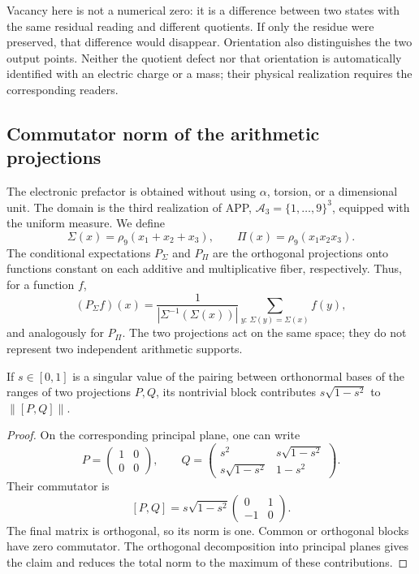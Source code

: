 Vacancy here is not a numerical zero: it is a difference between two
states with the same residual reading and different quotients. If only
the residue were preserved, that difference would disappear.
Orientation also distinguishes the two output points. Neither the quotient
defect nor that orientation is automatically identified with an electric
charge or a mass; their physical realization requires the corresponding
readers.

\subsection{Commutator norm of the arithmetic projections}

The electronic prefactor is obtained without using \(\alpha\), torsion,
or a dimensional unit. The domain is the third realization of APP,
\(\mathcal A_3=\{1,\ldots,9\}^3\), equipped with the uniform measure.
We define
\[
 \Sigma(x)=\rho_9(x_1+x_2+x_3),\qquad
 \Pi(x)=\rho_9(x_1x_2x_3).
\]
The conditional expectations \(P_\Sigma\) and \(P_\Pi\) are the
orthogonal projections onto functions constant on each additive
and multiplicative fiber, respectively. Thus, for a function \(f\),
\[
 (P_\Sigma f)(x)
 =\frac{1}{|\Sigma^{-1}(\Sigma(x))|}
   \sum_{y:\,\Sigma(y)=\Sigma(x)}f(y),
\]
and analogously for \(P_\Pi\). The two projections act on the
same space; they do not represent two independent arithmetic supports.

\begin{lemma}
If \(s\in[0,1]\) is a singular value of the pairing between
orthonormal bases of the ranges of two projections \(P,Q\), its nontrivial
block contributes \(s\sqrt{1-s^2}\) to
\(\|[P,Q]\|\).
\end{lemma}
\begin{proof}
On the corresponding principal plane, one can write
\[
 P=\begin{pmatrix}1&0\\0&0\end{pmatrix},\qquad
 Q=\begin{pmatrix}
 s^2&s\sqrt{1-s^2}\\
 s\sqrt{1-s^2}&1-s^2
 \end{pmatrix}.
\]
Their commutator is
\[
 [P,Q]=s\sqrt{1-s^2}
 \begin{pmatrix}0&1\\-1&0\end{pmatrix}.
\]
The final matrix is orthogonal, so its norm is one. Common
or orthogonal blocks have zero commutator. The orthogonal decomposition
into principal planes gives the claim and reduces the total norm to the maximum
of these contributions.
\end{proof}


